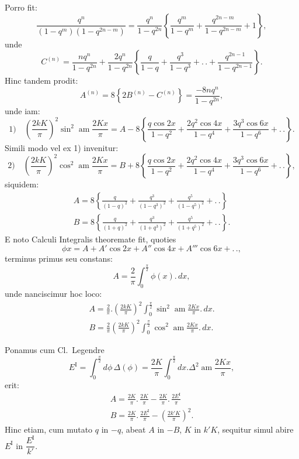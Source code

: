 \documentclass{article}
\begin{document}
Porro fit:
\[
\frac{q^{n}}{(1-q^{m})(1-q^{2n-m})}=\frac{q^{n}}{1-q^{2n}}\left\{\frac{q^{m}}{1-q^{m}}+\frac{q^{2n-m}}{1-q^{2n-m}}+1\right\},
\]
unde
\[
C^{(n)}=\frac{nq^{n}}{1-q^{2n}}+\frac{2q^{n}}{1-q^{2n}}\left\{\frac{q}{1-q}+\frac{q^{3}}{1-q^{3}}+.\,.+\frac{q^{2n-1}}{1-q^{2n-1}}\right\}.
\]
Hinc tandem prodit:
\[
A^{(n)}=8\left\{2B^{(n)}-C^{(n)}\right\}=\frac{-8nq^{n}}{1-q^{2n}},
\]
unde iam:
\[
\text{1)}\quad\left(\frac{2kK}{\pi}\right)^{2}\sin^{2}\operatorname{am}\frac{2Kx}{\pi}=A-8\left\{\frac{q\cos 2x}{1-q^{2}}+\frac{2q^{2}\cos 4x}{1-q^{4}}+\frac{3q^{3}\cos 6x}{1-q^{6}}+.\,.\right\}.
\]
Simili modo vel ex 1) invenitur:
\[
\text{2)}\quad\left(\frac{2kK}{\pi}\right)^{2}\cos^{2}\operatorname{am}\frac{2Kx}{\pi}=B+8\left\{\frac{q\cos 2x}{1-q^{2}}+\frac{2q^{2}\cos 4x}{1-q^{4}}+\frac{3q^{3}\cos 6x}{1-q^{6}}+.\,.\right\},
\]
siquidem:
\[
\begin{gathered}
A=8\left\{\frac{q}{(1-q)^{2}}+\frac{q^{3}}{(1-q^{3})^{2}}+\frac{q^{5}}{(1-q^{5})^{2}}+.\,.\right\}\\[1.5ex]
B=8\left\{\frac{q}{(1+q)^{2}}+\frac{q^{3}}{(1+q^{3})^{2}}+\frac{q^{5}}{(1+q^{5})^{2}}+.\,.\right\}.
\end{gathered}
\]
E noto Calculi Integralis theoremate fit, quoties
\[
\phi x=A+A'\cos 2x+A''\cos 4x+A'''\cos 6x+.\,.,
\]
terminus primus seu constans:
\[
A=\frac{2}{\pi}\int_{0}^{\frac{\pi}{2}}\phi(x).\,dx,
\]
unde nanciscimur hoc loco:
\[
\begin{gathered}
A=\frac{2}{\pi}.\left(\frac{2kK}{\pi}\right)^{2}\int_{0}^{\frac{\pi}{2}}\sin^{2}\operatorname{am}\frac{2Kx}{\pi}.\,dx.\\[1.5ex]
B=\frac{2}{\pi}\left(\frac{2kK}{\pi}\right)^{2}\int_{0}^{\frac{\pi}{2}}\cos^{2}\operatorname{am}\frac{2Kx}{\pi}.\,dx.
\end{gathered}
\]

Ponamus cum Cl.\ Legendre
\[
E^{\mathrm{I}}=\int_{0}^{\frac{\pi}{2}}d\phi\,\Delta(\phi)=\frac{2K}{\pi}\int_{0}^{\frac{\pi}{2}}dx.\Delta^{2}\operatorname{am}\frac{2Kx}{\pi},
\]
erit:
\[
\begin{gathered}
A=\frac{2K}{\pi}.\,\frac{2K}{\pi}-\frac{2K}{\pi}.\,\frac{2E^{\mathrm{I}}}{\pi}\\[1.5ex]
B=\frac{2K}{\pi}.\,\frac{2E^{\mathrm{I}}}{\pi}-\left(\frac{2k'K}{\pi}\right)^{2}.
\end{gathered}
\]
Hinc etiam, cum mutato $q$ in $-q$, abeat $A$ in $-B$, $K$ in $k'K$, sequitur simul abire $E^{\mathrm{I}}$ in $\dfrac{E^{\mathrm{I}}}{k'}$.
\end{document}
